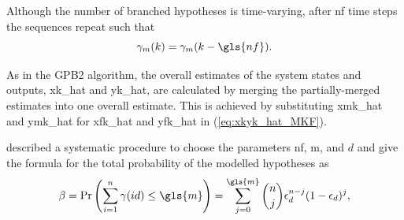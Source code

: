 Although the number of branched hypotheses is time-varying, after \gls{nf} time steps the sequences repeat such that 
\begin{equation} \label{eq:rmkrmkmNf_SFex2}
	\mathbf{\gamma}_m(k) = \mathbf{\gamma}_m(k-\gls{nf}).
\end{equation}

As in the \gls{GPB2} algorithm, the overall estimates of the system states and outputs, \gls{xk_hat} and \gls{yk_hat}, are calculated by merging the partially-merged estimates into one overall estimate. This is achieved by substituting \gls{xmk_hat} and \gls{ymk_hat} for \gls{xfk_hat} and \gls{yfk_hat} in (\ref{eq:xkyk_hat_MKF}).

\cite{robertson_detection_1995} described a systematic procedure to choose the parameters \gls{nf}, \gls{m}, and $d$ and give the formula for the total probability of the modelled hypotheses as
\begin{equation} \label{eq:p_gamma}
	\beta=\operatorname{Pr}\left(\sum_{i=1}^{n} \gamma(i d) \leq \gls{m} \right) = \sum_{j=0}^{\gls{m}} \binom{n}{j} \epsilon_d^{n-j}(1-\epsilon_d)^{j},
\end{equation}
%

